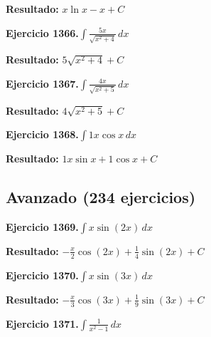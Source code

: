 \documentclass[10pt,a4paper]{article}
\begin{document}
\begin{solbox}
\textbf{Resultado:} \(\displaystyle x\ln x - x + C\)
\end{solbox}

\newpage
\begin{ejbox}
\textbf{Ejercicio 1366.}\quad $\int \frac{5x}{\sqrt{x^2+4}}\,dx$
\end{ejbox}

\begin{solbox}
\textbf{Resultado:} \(\displaystyle 5\sqrt{x^2+4} + C\)
\end{solbox}

\begin{ejbox}
\textbf{Ejercicio 1367.}\quad $\int \frac{4x}{\sqrt{x^2+5}}\,dx$
\end{ejbox}

\begin{solbox}
\textbf{Resultado:} \(\displaystyle 4\sqrt{x^2+5} + C\)
\end{solbox}

\begin{ejbox}
\textbf{Ejercicio 1368.}\quad $\int 1x \cos x\,dx$
\end{ejbox}

\begin{solbox}
\textbf{Resultado:} \(\displaystyle 1x\sin x + 1\cos x + C\)
\end{solbox}

\newpage
\newpage
\subsection{Avanzado (234 ejercicios)}

\begin{ejbox}
\textbf{Ejercicio 1369.}\quad $\int x \sin(2x)\,dx$
\end{ejbox}

\begin{solbox}
\textbf{Resultado:} \(\displaystyle -\frac{x}{2}\cos(2x) + \frac{1}{4}\sin(2x) + C\)
\end{solbox}

\begin{ejbox}
\textbf{Ejercicio 1370.}\quad $\int x \sin(3x)\,dx$
\end{ejbox}

\begin{solbox}
\textbf{Resultado:} \(\displaystyle -\frac{x}{3}\cos(3x) + \frac{1}{9}\sin(3x) + C\)
\end{solbox}

\begin{ejbox}
\textbf{Ejercicio 1371.}\quad $\int \frac{1}{x^2-1}\,dx$
\end{ejbox}
\end{document}
